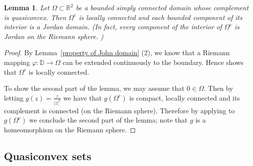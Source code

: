 \documentclass[reqno,11pt]{amsart}
\makeatletter
\def\dist{{\mathop\mathrm{\,dist\,}}}
\def\diam{{\mathop\mathrm{\,diam\,}}}
\newtheorem{lem}[thm]{Lemma}%
\numberwithin{equation}{section}
\theoremstyle{remark}
\makeatother
\begin{document}
\begin{lem}\label{complement of John}
Let $\Omega\subset \mathbb R^2$ be a bounded simply connected domain whose complement is quasiconvex. Then $\Omega^c$ is locally connected and each bounded component of its interior is a Jordan domain. (In fact, every component of the interior of $\Omega^c$ is Jordan on the Riemann sphere. )
\end{lem}
\begin{proof}
By Lemma~\ref{property of John domain} (2), we know that a Riemann mapping $\varphi\colon \mathbb D \to \Omega$ can be extended continuously to the boundary. Hence  \cite[Page 14, Corollary]{DH} shows that $\Omega^c$ is locally connected. 

To show the second part of the lemma, we may assume that $0\in \Omega$. Then by letting $g(z)=\frac z {|z|^2}$ we have that $g(\Omega^c)$ is compact, locally connected and its complement is connected (on the Riemann sphere). Therefore by applying \cite[Page 17, Proposition 2.3]{DH} to $g(\Omega^c)$ we conclude the second part of the lemma; note that $g$ is a homeomorphism on the Riemann sphere. 
\end{proof}


%

 
\subsection{Quasiconvex sets}
\end{document}
